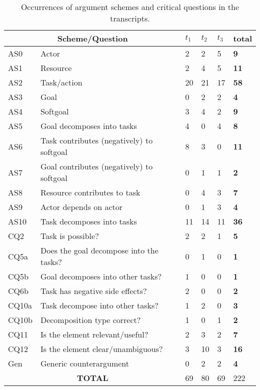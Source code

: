 \begin{table}[t]
\centering
\begin{tabularx}{0.5\textwidth}{|l|X|l|l|l|>{\bfseries}l|}
\hline
\multicolumn{2}{|c|}{\textbf{Scheme/Question}} & $t_1$ & $t_2$ & $t_3$ & \textbf{total}\\
\hline 
AS0 & Actor & 2 & 2 & 5 & 9\\
\hline
AS1 & Resource & 2 & 4 & 5 & 11\\
\hline
AS2 & Task/action & 20 & 21 & 17 & 58\\
\hline
AS3 & Goal & 0 & 2 & 2 & 4\\
\hline
AS4 & Softgoal & 3 & 4 & 2 & 9\\
\hline
AS5 & Goal decomposes into tasks & 4 &0& 4 & 8\\
\hline
AS6 & Task contributes (negatively) to softgoal & 8 & 3 &0& 11\\
\hline
AS7 & Goal contributes (negatively) to softgoal &0& 1 & 1 & 2\\
\hline
AS8 & Resource contributes to task & 0 & 4 & 3 & 7\\
\hline
AS9 & Actor depends on actor &0& 1 & 3 & 4\\
\hline
AS10 & Task decomposes into tasks & 11 &14 &11 &36\\ 
\hline
\hline
CQ2 & Task is possible? & 2 & 2 & 1 & 5\\
\hline		
CQ5a & Does the goal decompose into the tasks? & 0 & 1 & 0 & 1\\
\hline
CQ5b & Goal decomposes into other tasks? & 1 & 0 & 0 & 1\\
\hline
CQ6b & Task has negative side effects? & 2 & 0 & 0 & 2\\
\hline
CQ10a & Task decompose into other tasks? & 1 &2 &0&3\\
\hline
CQ10b & Decomposition type correct? &1 &0& 1 &2\\
\hline
\hline
CQ11 & Is the element relevant/useful? & 2 & 3 & 2 &7\\
\hline
CQ12 & Is the element clear/unambiguous? &3 &10 & 3 & 16\\
\hline
\hline
Gen & Generic counterargument & 0& 2 & 2 & 4\\
\hline
\hline
\multicolumn{2}{|c|}{\textbf{TOTAL}}&69&80&69&222\\
\hline
\end{tabularx}
\caption{Occurrences of argument schemes and critical questions in the transcripts.}
\label{table:transcripts:results:argumentschemes}
\end{table}


